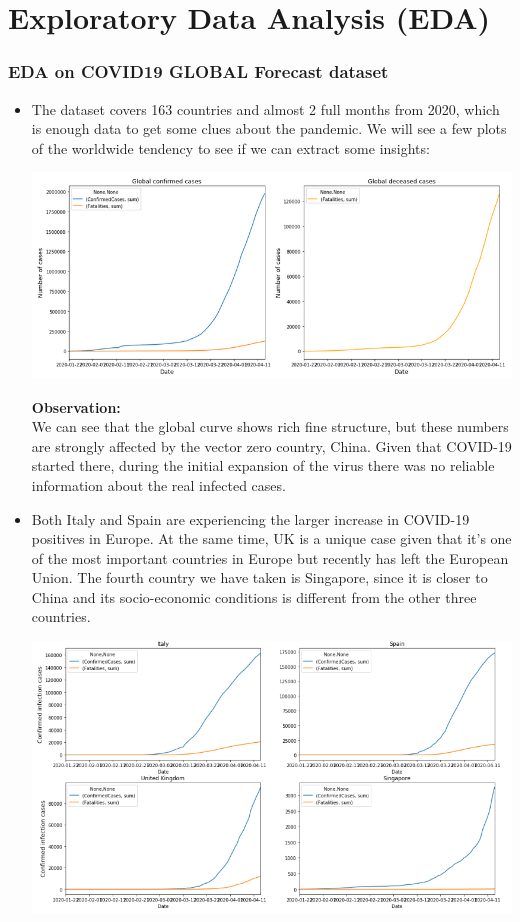 \documentclass{article}
\begin{document}
\section*{Exploratory Data Analysis (EDA)}
\subsubsection*{EDA on COVID19 GLOBAL Forecast dataset}
\begin{itemize}
\item
The dataset covers 163 countries and almost 2 full months from 2020, which is enough data to get some clues about the pandemic. We will see a few plots of the worldwide tendency to see if we can extract some insights:
\begin{center}
\includegraphics[scale=0.70]{corona_2_global_cases}
\end{center}
\textbf{Observation:}
\\We can see that the global curve shows rich fine structure, but these numbers are strongly affected by the vector zero country, China. Given that COVID-19 started there, during the initial expansion of the virus there was no reliable information about the real infected cases.
\item
Both Italy and Spain are experiencing the larger increase in COVID-19 positives in Europe. At the same time, UK is a unique case given that it's one of the most important countries in Europe but recently has left the European Union. The fourth country we have taken is Singapore, since it is closer to China and its socio-economic conditions is different from the other three countries.
\begin{center}
\includegraphics[scale=0.60]{corona_3_countries.png}

\end{center}
\end{itemize}
\end{document}
